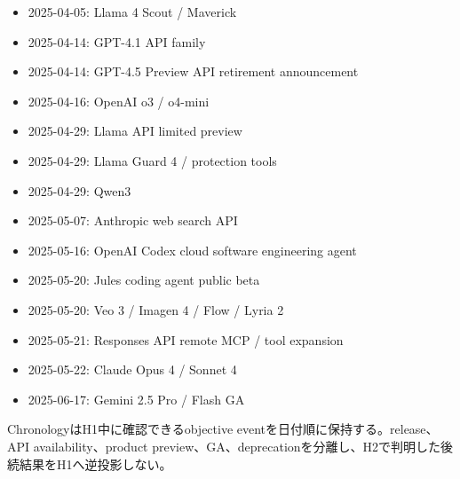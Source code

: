 \begin{itemize}
  \item 2025-04-05: Llama 4 Scout / Maverick \autocite{src-05f285e9757b}
  \item 2025-04-14: GPT-4.1 API family \autocite{src-31799a46d8d0}
  \item 2025-04-14: GPT-4.5 Preview API retirement announcement \autocite{src-31799a46d8d0}
  \item 2025-04-16: OpenAI o3 / o4-mini \autocite{src-bf92f3d905c3}
  \item 2025-04-29: Llama API limited preview \autocite{src-fca961b24baf}
  \item 2025-04-29: Llama Guard 4 / protection tools \autocite{src-383476bdf62e}
  \item 2025-04-29: Qwen3 \autocite{src-3e4a3f3b3d83}
\end{itemize}

\begin{itemize}
  \item 2025-05-07: Anthropic web search API \autocite{src-e31c642d34b6}
  \item 2025-05-16: OpenAI Codex cloud software engineering agent \autocite{src-e7aef8f1b13b}
  \item 2025-05-20: Jules coding agent public beta \autocite{src-8b595b787bad}
  \item 2025-05-20: Veo 3 / Imagen 4 / Flow / Lyria 2 \autocite{src-e68f8ce96685}
  \item 2025-05-21: Responses API remote MCP / tool expansion \autocite{src-9257c39d4172}
  \item 2025-05-22: Claude Opus 4 / Sonnet 4 \autocite{src-4ec03078d316}
\end{itemize}

\begin{itemize}
  \item 2025-06-17: Gemini 2.5 Pro / Flash GA \autocite{src-53f15d483a2d}
\end{itemize}

\begin{claimboundary}
ChronologyはH1中に確認できるobjective eventを日付順に保持する。release、API availability、product preview、GA、deprecationを分離し、H2で判明した後続結果をH1へ逆投影しない。
\end{claimboundary}
